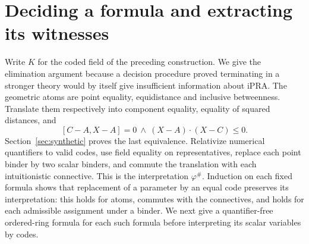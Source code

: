 \section{Deciding a formula and extracting its witnesses}
\label{sec:qe}
Write $K$ for the coded field of the preceding construction. We give the
elimination argument because a decision procedure proved terminating in a
stronger theory would by itself give insufficient information about iPRA.
The geometric atoms are point equality, equidistance and inclusive
betweenness. Translate them respectively into component equality,
equality of squared distances, and
\[
  [C-A,X-A]=0\ \land\ (X-A)\cdot(X-C)\le0.
\]
Section~\ref{sec:synthetic} proves the last equivalence. Relativize numerical
quantifiers to valid codes, use field equality on representatives, replace
each point binder by two scalar binders, and commute the translation with
each intuitionistic connective. This is the interpretation $\varphi^\#$.
Induction on each fixed formula shows that replacement of a parameter by an equal code preserves its interpretation: this holds for atoms, commutes with the connectives, and holds for each admissible assignment under a binder. We next give a quantifier-free ordered-ring formula for each such
formula before interpreting its scalar variables by codes.


